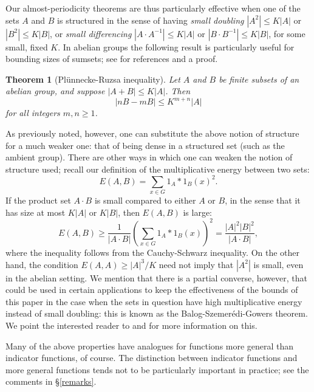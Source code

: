 \documentclass[12pt,a4paper,reqno]{amsart}
\numberwithin{equation}{section}
\theoremstyle{plain}
\newtheorem{theorem}{Theorem}[section]
\theoremstyle{definition}
\renewcommand{\leq}{\leqslant}
\renewcommand{\geq}{\geqslant}
\begin{document}
Our almost-periodicity theorems are thus particularly effective when one of the sets $A$ and $B$ is structured in the sense of having \emph{small doubling} $|A^2| \leq K|A|$ or $|B^2| \leq K|B|$, or \emph{small differencing} $|A\cdot A^{-1}| \leq K|A|$ or $|B\cdot B^{-1}| \leq K|B|$, for some small, fixed $K$. In abelian groups the following result is particularly useful for bounding sizes of sumsets; see \cite[Chapter 6]{tao-vu} for references and a proof.

\begin{theorem}[Pl\"unnecke-Ruzsa inequality]\label{plunnecke-ruzsa}
Let $A$ and $B$ be finite subsets of an abelian group, and suppose $|A+B| \leq K|A|$. Then
\[ |n B - m B| \leq K^{m+n} |A| \]
for all integers $m, n \geq 1$.
\end{theorem}

As previously noted, however, one can substitute the above notion of structure for a much weaker one: that of being dense in a structured set (such as the ambient group). There are other ways in which one can weaken the notion of structure used; recall our definition of the multiplicative energy between two sets:
\[ E(A,B) = \sum_{x \in G} 1_A*1_B(x)^2. \]
If the product set $A \cdot B$ is small compared to either $A$ or $B$, in the sense that it has size at most $K|A|$ or $K|B|$, then $E(A,B)$ is large:
\begin{equation}
E(A,B) \geq \frac{1}{|A\cdot B|}\left(\sum_{x \in G} 1_A*1_B(x) \right)^2 = \frac{|A|^2|B|^2}{|A \cdot B|}, \label{energy-CS} \end{equation}
where the inequality follows from the Cauchy-Schwarz inequality. On the other hand, the condition $E(A,A) \geq |A|^3/K$ need not imply that $|A^2|$ is small, even in the abelian setting. We mention that there is a partial converse, however, that could be used in certain applications to keep the effectiveness of the bounds of this paper in the case when the sets in question have high multiplicative energy instead of small doubling: this is known as the Balog-Szemer\'edi-Gowers theorem. We point the interested reader to \cite[Chapter 2]{tao-vu} and \cite[Section 5]{tao:non-comm} for more information on this.

Many of the above properties have analogues for functions more general than indicator functions, of course. The distinction between indicator functions and more general functions tends not to be particularly important in practice; see the comments in \S\ref{remarks}.
\end{document}
